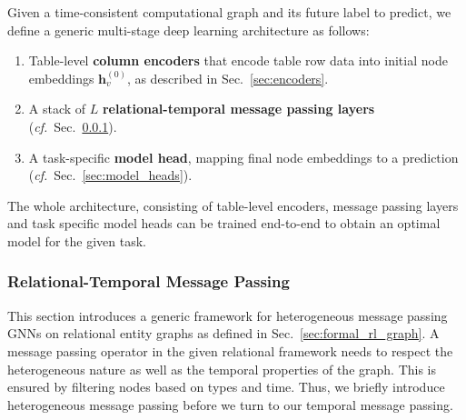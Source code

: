 Given a time-consistent computational graph and its future label to predict, we define a generic multi-stage deep learning architecture as follows:
\begin{enumerate}
\setlength\itemsep{0em}
    \item Table-level \textbf{column encoders} that encode table row data into initial node embeddings $\mathbf{h}^{(0)}_v$, as described in Sec.~\ref{sec:encoders}.
    \item A stack of $L$ \textbf{relational-temporal message passing layers} (\emph{cf.}~Sec.~\ref{sec:rl_mp}).
    \item A task-specific \textbf{model head}, mapping final node embeddings to a prediction (\emph{cf.}~Sec.~\ref{sec:model_heads}).
\end{enumerate}
The whole architecture, consisting of table-level encoders, message passing layers and task specific model heads can be trained end-to-end to obtain an optimal model for the given task.


\subsubsection{Relational-Temporal Message Passing}
\label{sec:rl_mp}
This section introduces a generic framework for heterogeneous message passing GNNs on relational entity graphs as defined in Sec.~\ref{sec:formal_rl_graph}.  
A message passing operator in the given relational framework needs to respect the heterogeneous nature as well as the temporal properties of the graph. This is ensured by filtering nodes based on types and time. Thus, we briefly introduce heterogeneous message passing before we turn to our temporal message passing.


